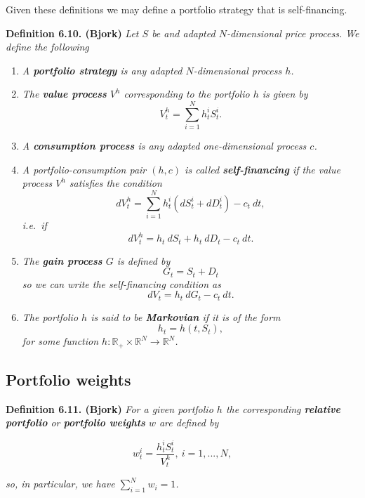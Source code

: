 \documentclass[a4paper,12pt,openany]{book}
\providecommand{\tightlist}{%
 \setlength{\itemsep}{0pt}\setlength{\parskip}{0pt}}
\begin{document}
Given these definitions we may define a portfolio strategy that is self-financing.

\textbf{Definition 6.10. (Bjork)} \emph{Let \(S\) be and adapted \(N\)-dimensional price process. We define the following}

\begin{enumerate}
\def\labelenumi{\arabic{enumi}.}
\tightlist
\item
  \emph{A \textbf{portfolio strategy} is any adapted \(N\)-dimensional process \(h\).}
\item
  \emph{The \textbf{value process} \(V^h\) corresponding to the portfolio \(h\) is given by}
  \[
    V_t^h=\sum_{i=1}^N h_t^iS_t^i.\tag{6.17}
    \]
\item
  \emph{A \textbf{consumption process} is any adapted one-dimensional process \(c\).}
\item
  \emph{A portfolio-consumption pair \((h,c)\) is called \textbf{self-financing} if the value process \(V^h\) satisfies the condition}
  \[
    dV_t^h=\sum_{i=1}^N h_t^i(dS_t^i+d D^i_t)-c_t\ dt,\tag{6.18}
    \]
  \emph{i.e.~if}
  \[
    dV_t^h=h_t\ dS_t + h_t\ dD_t -c_t\ dt.
    \]
\item
  \emph{The \textbf{gain process} \(G\) is defined by}
  \[
    G_t=S_t+D_t\tag{6.19}
    \]
  \emph{so we can write the self-financing condition as}
  \[
    dV_t=h_t\ dG_t-c_t\ dt.\tag{6.20}
    \]
\item
  \emph{The portfolio \(h\) is said to be \textbf{Markovian} if it is of the form}
  \[
    h_t=h(t,S_t),
    \]
  \emph{for some function \(h : \mathbb{R}_+\times \mathbb{R}^N\to\mathbb{R}^N\).}
\end{enumerate}

\hypertarget{portfolio-weights}{%
\subsection{Portfolio weights}\label{portfolio-weights}}

\textbf{Definition 6.11. (Bjork)} \emph{For a given portfolio \(h\) the corresponding \textbf{relative portfolio} or \textbf{portfolio weights} \(w\) are defined by}

\[
w_t^i=\frac{h_t^iS_t^i}{V_t^h},\ i=1,...,N,\tag{6.21}
\]

\emph{so, in particular, we have \(\sum_{i=1}^N w_i=1\).}
\end{document}
